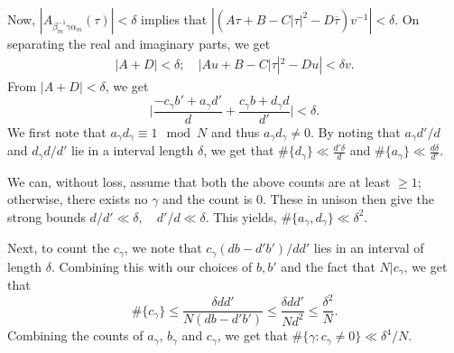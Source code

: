 \documentclass[11pt]{amsart}
\numberwithin{equation}{section}
\theoremstyle{plain}
\theoremstyle{definition}
\newcommand{\q}{\quad}
\begin{document}
Now, $|A_{\beta_m^{-1} \gamma \alpha_m}(\tau)| < \delta$ implies that $\left|(A\tau+B-C|\tau|^2-D\overline{\tau})v^{-1}\right|< \delta$. On separating the real and imaginary parts, we get
\begin{align}
    |A+D|< \delta ;\q |Au+B-C|\tau|^2-Du|< \delta v .
\end{align}
From $|A+D|<\delta$, we get
\begin{equation} \label{abc}
    \big|\frac{-c_\gamma  b' + a_\gamma  d'}{d}+\frac{c_\gamma b + d_\gamma d}{d'}\big|<\delta.
\end{equation}
We first note that $a_\gamma d_\gamma\equiv 1\mod N$ and thus $a_\gamma d_\gamma \neq 0$. By noting that $a_\gamma d'/d$ and $d_\gamma d/d'$ lie in a interval length $\delta$, we get that $ \displaystyle \#\{ d_\gamma\}\ll \frac{d'\delta}{d}$ and $\displaystyle \#\{ a_\gamma\}\ll \frac{d\delta}{d'}$.

We can, without loss, assume that both the above counts are at least $\ge 1$; otherwise, there exists no $\gamma$ and the count is $0$. These in unison then give the strong bounds $\displaystyle d/d' \ll \delta, \q d'/d \ll \delta$. This yields, $ \displaystyle \#\{a_\gamma, d_\gamma\}\ll \delta^2$.

Next, to count the $c_\gamma$, we note that $c_\gamma(db-d'b')/dd'$ lies in an interval of length $\delta$. Combining this with our choices of $b,b'$ and the fact that $N|c_\gamma$, we get that
\begin{equation}
    \#\{c_\gamma\}\le \frac{\delta dd'}{N(db-d'b')} \le \frac{\delta dd'}{Nd^2}\le \frac{\delta^2 }{N}.
\end{equation}
Combining the counts of $a_\gamma$, $b_\gamma$ and $c_\gamma$, we get that $\#\{\gamma : c_\gamma\neq 0\} \ll \delta^4/N$.
\end{document}
